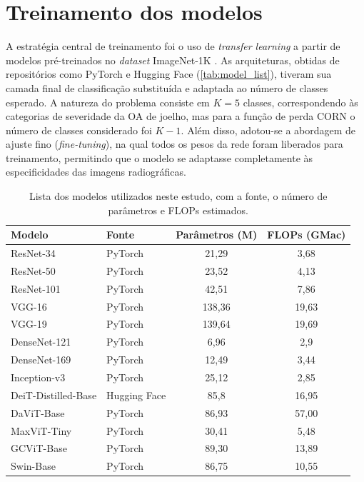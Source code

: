 \section{Treinamento dos modelos}

A estratégia central de treinamento foi o uso de \textit{transfer learning} a partir de modelos pré-treinados no \textit{dataset} ImageNet-1K \cite{Russakovsky2015}. As arquiteturas, obtidas de repositórios como PyTorch e Hugging Face (\autoref{tab:model_list}), tiveram sua camada final de classificação substituída e adaptada ao número de classes esperado. A natureza do problema consiste em $K=5$ classes, correspondendo às categorias de severidade da OA de joelho, mas para a função de perda CORN o número de classes considerado foi $K-1$. Além disso, adotou-se a abordagem de ajuste fino (\textit{fine-tuning}), na qual todos os pesos da rede foram liberados para treinamento, permitindo que o modelo se adaptasse completamente às especificidades das imagens radiográficas.

\begin{table}[ht]
    \centering
    \begin{tabular}{|l|l|c|c|}
        \hline
        \textbf{Modelo} & \textbf{Fonte} & \textbf{Parâmetros (M)} & \textbf{FLOPs (GMac)} \\
        \hline
        ResNet-34 & PyTorch & 21,29 & 3,68 \\
        \hline
        ResNet-50 & PyTorch & 23,52 & 4,13 \\
        \hline
        ResNet-101 & PyTorch & 42,51 & 7,86 \\
        \hline
        VGG-16 & PyTorch & 138,36 & 19,63 \\
        \hline
        VGG-19 & PyTorch & 139,64 & 19,69 \\
        \hline
        DenseNet-121 & PyTorch & 6,96 & 2,9 \\
        \hline
        DenseNet-169 & PyTorch & 12,49 & 3,44 \\
        \hline
        Inception-v3 & PyTorch & 25,12 & 2,85 \\
        \hline
        DeiT-Distilled-Base & Hugging Face & 85,8 & 16,95 \\
        \hline
        DaViT-Base & PyTorch & 86,93 & 57,00 \\
        \hline
        MaxViT-Tiny & PyTorch & 30,41 & 5,48 \\
        \hline
        GCViT-Base & PyTorch & 89,30 & 13,89 \\
        \hline
        Swin-Base & PyTorch & 86,75 & 10,55 \\
        \hline
    \end{tabular}
    \caption{Lista dos modelos utilizados neste estudo, com a fonte, o número de parâmetros e FLOPs estimados.}
    \label{tab:model_list}
\end{table}

